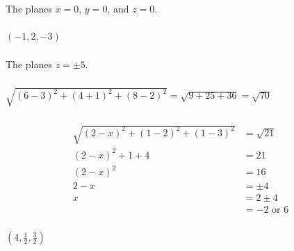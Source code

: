 \documentclass{article}
\begin{document}
The planes $x = 0$, $y = 0$, and $z = 0$.

\setcounter{subsubsection}{16}
\subsubsection{}

$(-1, 2, -3)$

\setcounter{subsubsection}{18}
\subsubsection{}

The planes $z = \pm 5$.

\setcounter{subsubsection}{20}
\subsubsection{}

$\sqrt{(6 - 3)^2 + (4 + 1)^2 + (8 - 2)^2} = \sqrt{9 + 25 + 36} = \sqrt{70}$

\setcounter{subsubsection}{30}
\subsubsection{}

\begin{align*}
  \sqrt{(2 - x)^2 + (1 - 2)^2 + (1 - 3)^2} & = \sqrt{21}        \\
  (2 - x)^2 + 1 + 4                        & = 21               \\
  (2 - x)^2                                & = 16               \\
  2 - x                                    & = \pm 4            \\
  x                                        & = 2 \pm 4          \\
                                           & = -2 \text{ or } 6
\end{align*}

\setcounter{subsubsection}{32}
\subsubsection{}

$\left( 4, \frac{1}{2}, \frac{3}{2} \right)$

\setcounter{subsubsection}{36}
\subsubsection{}
\end{document}
